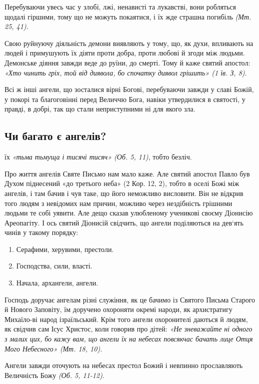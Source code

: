 \documentclass[main.tex]{subfiles}
\begin{document}
Перебуваючи увесь час у злобі, лжі, ненависті та лукавстві, вони робляться щодалі гіршими, тому що не можуть покаятися, і їх жде страшна погибіль \emph{(Мт. 25, 41).}

Свою руйнуючу діяльність демони виявляють у тому, що, як духи, впливають на людей і примушують їх діяти проти добра, проти любові й згоди між людьми. Демонське діяння завжди веде до руїни, до смерті. Тому й каже святий апостол: \emph{«Хто чинить гріх, той від диявола, бо спочатку диявол грішить» (1 їв. З, 8)}.

Всі ж інші ангели, що зосталися вірні Богові, перебуваючи завжди у славі Божій, у покорі та благоговінні перед Величчю Бога, навіки утвердилися в святості, у правді, в добрі, так що стали неприступними ні для якого зла.

\subsection{Чи багато є ангелів?}
їх \emph{«тьма тьмуща і тисячі тисяч» (Об. 5, 11)}, тобто безліч.
 
Про життя ангелів Святе Письмо нам мало каже. Але святий апостол Павло був Духом піднесений «до третього неба» (2 Кор. 12, 2), тобто в оселі Божі між ангелів, і там бачив і чув таке, що його неможливо висловити. Він не відкрив того людям з невідомих нам причин, можливо через нездібність грішними людьми те собі уявити. Але дещо сказав улюбленому ученикові своєму Діонисію Ареопагіту. І ось святий Діонисій свідчить, що ангели поділяються на дев`ять чинів у такому порядку:
\begin{enumerate}
    \item Серафими, херувими, престоли.
    \item Господства, сили, власті.
    \item Начала, архангели, ангели.
\end{enumerate}

Господь доручає ангелам різні служіння, як це бачимо із Святого Письма Старого й Нового Заповіту, їм доручено охороняти окремі народи, як архистратигу Михаїло-ві народ ізраїльський. Крім того ангели охоронителі даються й людям, як свідчив сам Ісус Христос, коли говорив про дітей: \emph{{\color{red} «Не зневажайте ні одного з малих цих, бо кажу вам, що ангели їх на небесах повсякчас бачать лице Отця Мого Небесного»} (Мт. 18, 10).}

Ангели завжди оточують на небесах престол Божий і невпинно прославляють Величність Божу \emph{(Об. 5, 11-12).}
\end{document}
